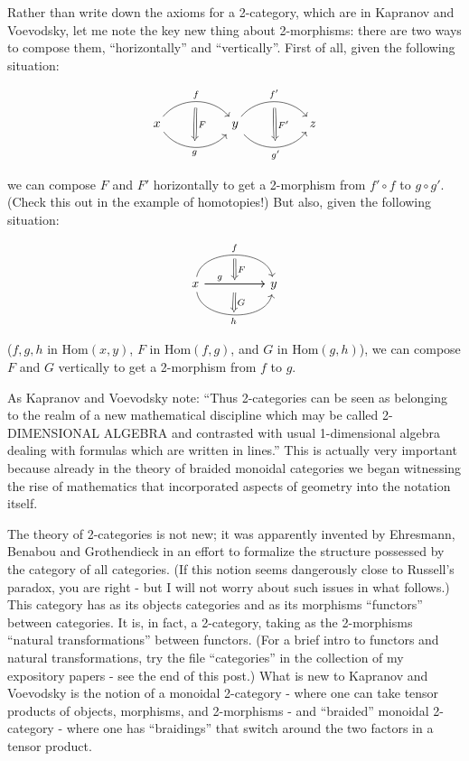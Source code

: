\documentclass{article}
\begin{document}
Rather than write down the axioms for a 2-category, which are in
Kapranov and Voevodsky, let me note the key new thing about 2-morphisms:
there are two ways to compose them, ``horizontally'' and ``vertically''.
First of all, given the following situation:

\[
  \begin{tikzcd}[sep=huge]
    x
      \rar[bend left=50,"f"{name=U}]
      \rar[bend right=50,swap,"g"{name=D}]
    & y
      \rar[bend left=50,"f'"{name=U'}]
      \rar[bend right=50,swap,"g'"{name=D'}]
      \arrow[Rightarrow,shorten=5pt,from=U,to=D,"F"]
    & z
      \arrow[Rightarrow,shorten=5pt,from=U',to=D',"F'"]
  \end{tikzcd}
\]

we can compose \(F\) and \(F'\) horizontally to get a 2-morphism from
\(f'\circ f\) to \(g \circ g'\). (Check this out in the example of
homotopies!) But also, given the following situation:

\[
  \begin{tikzcd}[sep=huge]
    x
      \rar[bend left=80,"f"{name=U}]
      \rar[""{name=M,below}]
      \rar[near start,"g"]
      \rar[bend right=80,swap,"h"{name=D}]
    & y
      \arrow[Rightarrow,shorten=3pt,from=U,to=M,"F"]
      \arrow[Rightarrow,shorten=2pt,from=M,to=D,"G"]
  \end{tikzcd}
\]

(\(f,g,h\) in \(\mathrm{Hom}(x,y)\), \(F\) in \(\mathrm{Hom}(f,g)\), and
\(G\) in \(\mathrm{Hom}(g,h)\)), we can compose \(F\) and \(G\)
vertically to get a 2-morphism from \(f\) to \(g\).

As Kapranov and Voevodsky note: ``Thus 2-categories can be seen as
belonging to the realm of a new mathematical discipline which may be
called 2-DIMENSIONAL ALGEBRA and contrasted with usual 1-dimensional
algebra dealing with formulas which are written in lines.'' This is
actually very important because already in the theory of braided
monoidal categories we began witnessing the rise of mathematics that
incorporated aspects of geometry into the notation itself.

The theory of 2-categories is not new; it was apparently invented by
Ehresmann, Benabou and Grothendieck in an effort to formalize the
structure possessed by the category of all categories. (If this notion
seems dangerously close to Russell's paradox, you are right - but I will
not worry about such issues in what follows.) This category has as its
objects categories and as its morphisms ``functors'' between categories.
It is, in fact, a 2-category, taking as the 2-morphisms ``natural
transformations'' between functors. (For a brief intro to functors and
natural transformations, try the file ``categories'' in the collection
of my expository papers - see the end of this post.) What is new to
Kapranov and Voevodsky is the notion of a monoidal 2-category - where
one can take tensor products of objects, morphisms, and 2-morphisms -
and ``braided'' monoidal 2-category - where one has ``braidings'' that
switch around the two factors in a tensor product.
\end{document}
